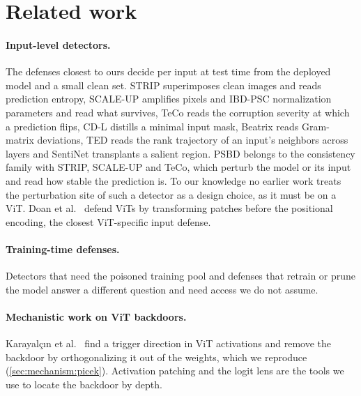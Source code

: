 \section{Related work}
\label{sec:related}

\paragraph{Input-level detectors.}
The defenses closest to ours decide per input at test time from the deployed model and a small clean set. STRIP \cite{gao2019strip} superimposes clean images and reads prediction entropy, SCALE-UP \cite{guo2023scale} amplifies pixels and IBD-PSC \cite{hou2024ibdpsc} normalization parameters and read what survives, TeCo \cite{liu2023teco} reads the corruption severity at which a prediction flips, CD-L \cite{huang2023distilling} distills a minimal input mask, Beatrix \cite{ma2023beatrix} reads Gram-matrix deviations, TED \cite{mo2024ted} reads the rank trajectory of an input's neighbors across layers and SentiNet \cite{chou2020sentinet} transplants a salient region. PSBD \cite{li2025psbd} belongs to the consistency family with STRIP, SCALE-UP and TeCo, which perturb the model or its input and read how stable the prediction is. To our knowledge no earlier work treats the perturbation site of such a detector as a design choice, as it must be on a ViT. Doan et al.~\cite{doan2023vitpatch} defend ViTs by transforming patches before the positional encoding, the closest ViT-specific input defense.

\paragraph{Training-time defenses.}
Detectors that need the poisoned training pool \cite{tran2018spectral,chen2018activation,tang2021demon,hayase2021spectre} and defenses that retrain or prune the model \cite{liu2018finepruning,li2021nad,wu2021anp,zeng2022ibau,zheng2022clp} answer a different question and need access we do not assume.

\paragraph{Mechanistic work on ViT backdoors.}
Karayal\c{c}{\i}n et al.~\cite{karayalcin2026backdoor} find a trigger direction in ViT activations and remove the backdoor by orthogonalizing it out of the weights, which we reproduce (\cref{sec:mechanism:picek}). Activation patching \cite{zhang2024patching} and the logit lens \cite{nostalgebraist2020logitlens,belrose2023tunedlens} are the tools we use to locate the backdoor by depth.
